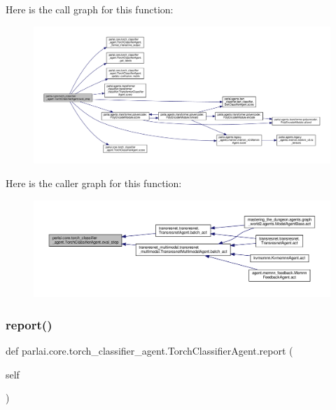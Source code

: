 Here is the call graph for this function\+:
\nopagebreak
\begin{figure}[H]
\begin{center}
\leavevmode
\includegraphics[width=350pt]{classparlai_1_1core_1_1torch__classifier__agent_1_1TorchClassifierAgent_a5d456df843180fb32ca574dc2a33cc80_cgraph}
\end{center}
\end{figure}
Here is the caller graph for this function\+:
\nopagebreak
\begin{figure}[H]
\begin{center}
\leavevmode
\includegraphics[width=350pt]{classparlai_1_1core_1_1torch__classifier__agent_1_1TorchClassifierAgent_a5d456df843180fb32ca574dc2a33cc80_icgraph}
\end{center}
\end{figure}
\mbox{\label{classparlai_1_1core_1_1torch__classifier__agent_1_1TorchClassifierAgent_acf3aabdf7a98e434614c4da20c599df2}} 
\subsubsection{\texorpdfstring{report()}{report()}}
{\footnotesize\ttfamily def parlai.\+core.\+torch\+\_\+classifier\+\_\+agent.\+Torch\+Classifier\+Agent.\+report (\begin{DoxyParamCaption}\item[{}]{self }\end{DoxyParamCaption})}

